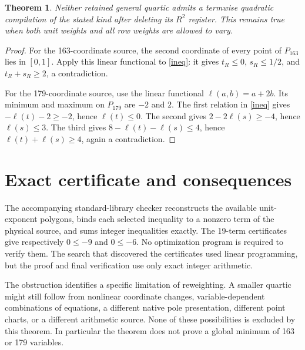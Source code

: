 \documentclass[11pt]{article}
\newtheorem{theorem}{Theorem}
\begin{document}
\begin{theorem}
Neither retained general quartic admits a termwise quadratic compilation
of the stated kind after deleting its \(R^2\) register. This remains
true when both unit weights and all row weights are allowed to vary.
\end{theorem}
\begin{proof}
For the 163-coordinate source, the second coordinate of every point of
\(P_{163}\) lies in \([0,1]\). Apply this linear functional to
\eqref{ineq}: it gives \(t_R\le0\), \(s_R\le1/2\), and
\(t_R+s_R\ge2\), a contradiction.

For the 179-coordinate source, use the linear functional
\(\ell(a,b)=a+2b\). Its minimum and maximum on \(P_{179}\)
are \(-2\) and \(2\). The first relation in \eqref{ineq} gives
\(-\ell(t)-2\ge-2\), hence \(\ell(t)\le0\).
The second gives \(2-2\ell(s)\ge-4\), hence \(\ell(s)\le3\).
The third gives \(8-\ell(t)-\ell(s)\le4\), hence
\(\ell(t)+\ell(s)\ge4\), again a contradiction.
\end{proof}

\section{Exact certificate and consequences}
The accompanying standard-library checker reconstructs the available
unit-exponent polygons, binds each selected inequality to a nonzero term
of the physical source, and sums integer inequalities exactly. The
19-term certificates give respectively \(0\le-9\) and \(0\le-6\).
No optimization program is required to verify them. The search that
discovered the certificates used linear programming, but the proof and
final verification use only exact integer arithmetic.

The obstruction identifies a specific limitation of reweighting. A
smaller quartic might still follow from nonlinear coordinate changes,
variable-dependent combinations of equations, a different native pole
presentation, different point charts, or a different arithmetic source.
None of these possibilities is excluded by this theorem. In particular
the theorem does not prove a global minimum of 163 or 179 variables.
\end{document}
